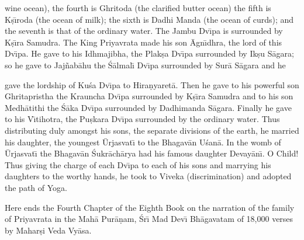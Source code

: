 wine ocean), the fourth is Ghritoda (the clarified butter ocean) the fifth is K\d{s}\={\i}roda (the ocean of milk); the sixth is Dadhi Manda (the ocean of curds); and the seventh is that of the ordinary water. The Jambu Dv\={\i}pa is surrounded by K\d{s}\={\i}ra Samudra. The King Priyavrata made his son \=Agn\={\i}dhra, the lord of this Dv\={\i}pa. He gave to his Idhmajibha, the Plak\d{s}a Dv\={\i}pa surrounded by Ik\d{s}u S\=agara; so he gave to Jaj\~nab\=ahu the \'S\=almal\={\i} Dv\={\i}pa surrounded by Sur\=a S\=agara and he

gave the lordship of Ku\'sa Dv\={\i}pa to Hira\d{n}yaret\=a. Then he gave to his powerful son Ghritapristha the Krauncha Dv\={\i}pa surrounded by K\d{s}\={\i}ra Samudra and to his son Medh\=atithi the \'S\=aka Dv\={\i}pa surrounded by Dadhimanda S\=agara. Finally he gave to his V\={\i}tihotra, the Pu\d{s}kara Dv\={\i}pa surrounded by the ordinary water. Thus distributing duly amongst his sons, the separate divisions of the earth, he married his daughter, the youngest \=Urjasvat\={\i} to the Bhagav\=an U\'san\=a. In the womb of \=Urjasvat\={\i} the Bhagav\=an \'Sukr\=ach\=arya had his famous daughter Devay\=an\={\i}. O Child! Thus giving the charge of each Dv\={\i}pa to each of his sons and marrying his daughters to the worthy hands, he took to Viveka (discrimination) and adopted the path of Yoga.

Here ends the Fourth Chapter of the Eighth Book on the narration of the family of Priyavrata in the Mah\=a Pur\=a\d{n}am, \'Sr\={\i} Mad Dev\={\i} Bh\=agavatam of 18,000 verses by Mahar\d{s}i Veda Vy\=asa.



